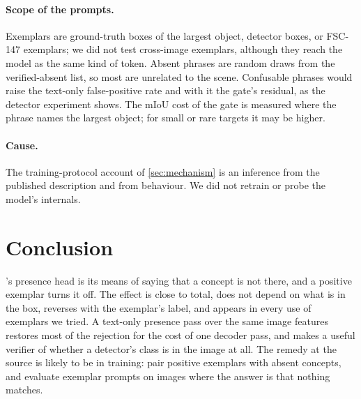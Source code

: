\paragraph{Scope of the prompts.}
Exemplars are ground-truth boxes of the largest object, detector boxes, or FSC-147 exemplars; we did not test cross-image exemplars, although they reach the model as the same kind of token.
Absent phrases are random draws from the verified-absent list, so most are unrelated to the scene.
Confusable phrases would raise the text-only false-positive rate and with it the gate's residual, as the detector experiment shows.
The mIoU cost of the gate is measured where the phrase names the largest object; for small or rare targets it may be higher.

\paragraph{Cause.}
The training-protocol account of \cref{sec:mechanism} is an inference from the published description and from behaviour.
We did not retrain or probe the model's internals.

\section{Conclusion}
\label{sec:conclusion}

\sam{}'s presence head is its means of saying that a concept is not there, and a positive exemplar turns it off.
The effect is close to total, does not depend on what is in the box, reverses with the exemplar's label, and appears in every use of exemplars we tried.
A text-only presence pass over the same image features restores most of the rejection for the cost of one decoder pass, and makes \sam{} a useful verifier of whether a detector's class is in the image at all.
The remedy at the source is likely to be in training: pair positive exemplars with absent concepts, and evaluate exemplar prompts on images where the answer is that nothing matches.
